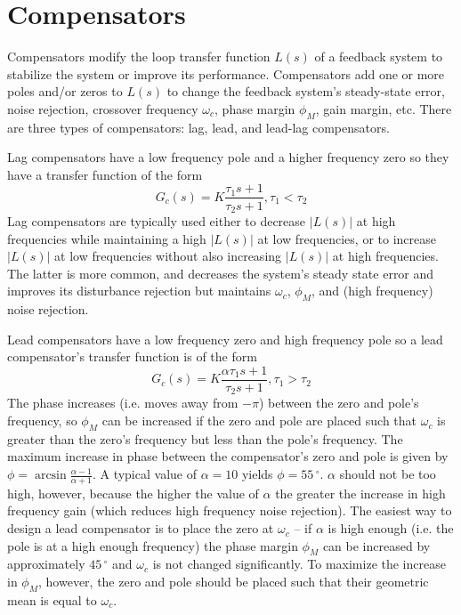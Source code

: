 \chapter{Compensators}
Compensators modify the loop transfer function $L(s)$ of a feedback system to stabilize the system or improve its performance.
Compensators add one or more poles and/or zeros to $L(s)$ to change the feedback system's steady-state error, noise rejection, crossover frequency $\omega_{c}$, phase margin $\phi_{M}$, gain margin, etc.
There are three types of compensators: lag, lead, and lead-lag compensators.

Lag compensators have a low frequency pole and a higher frequency zero so they have a transfer function of the form \[G_{c}(s) = K\frac{\tau_{1}s+1}{\tau_{2}s+1}, \tau_{1} < \tau_{2}\]
Lag compensators are typically used either to decrease $|L(s)|$ at high frequencies while maintaining a high $|L(s)|$ at low frequencies, or to increase $|L(s)|$ at low frequencies without also increasing $|L(s)|$ at high frequencies.
The latter is more common, and decreases the system's steady state error and improves its disturbance rejection but maintains $\omega_{c}$, $\phi_{M}$, and (high frequency) noise rejection. \autocite[269]{analog-design-feedback-lundberg}

Lead compensators have a low frequency zero and high frequency pole so a lead compensator's transfer function is of the form \[G_{c}(s) = K\frac{\alpha \tau_{1}s+1}{\tau_{2}s+1}, \tau_{1} > \tau_{2}\]
The phase increases (i.e. moves away from $-\pi$) between the zero and pole's frequency, so $\phi_{M}$ can be increased if the zero and pole are placed such that $\omega_{c}$ is greater than the zero's frequency but less than the pole's frequency.
The maximum increase in phase between the compensator's zero and pole is given by $\phi = \arcsin \frac{\alpha - 1}{\alpha + 1}$.
A typical value of $\alpha = 10$ yields $\phi = 55\,^{\circ}$.
$\alpha$ should not be too high, however, because the higher the value of $\alpha$ the greater the increase in high frequency gain (which reduces high frequency noise rejection).
The easiest way to design a lead compensator is to place the zero at $\omega_{c}$ -- if $\alpha$ is high enough (i.e. the pole is at a high enough frequency) the phase margin $\phi_{M}$ can be increased by approximately $45\,^{\circ}$ and $\omega_{c}$ is not changed significantly.
To maximize the increase in $\phi_{M}$, however, the zero and pole should be placed such that their geometric mean is equal to $\omega_{c}$. \autocite[277-278]{analog-design-feedback-lundberg}

